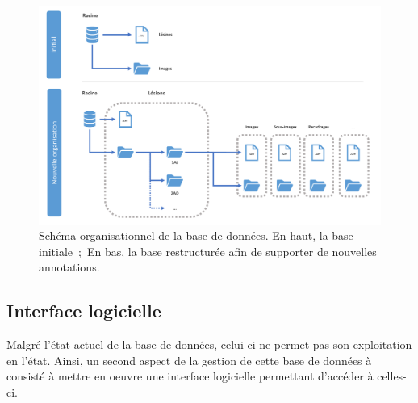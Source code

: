 \begin{figure}[H]
    \centering
    \includegraphics[width=0.9\linewidth]{contents/chapter_4/resources/scheme_data_structure.pdf}
    \caption{Schéma organisationnel de la base de données. En haut, la base initiale~;~En bas, la base restructurée afin de supporter de nouvelles annotations.}
    \label{fig:db_structure}
\end{figure}\par
\clearpage

\subsection{Interface logicielle}
\label{sec:dataset_api}
Malgré l'état actuel de la base de données, celui-ci ne permet pas son exploitation en l'état. Ainsi, un second aspect de la gestion de cette base de données à consisté à mettre en oeuvre une interface logicielle permettant d'accéder à celles-ci.\par

